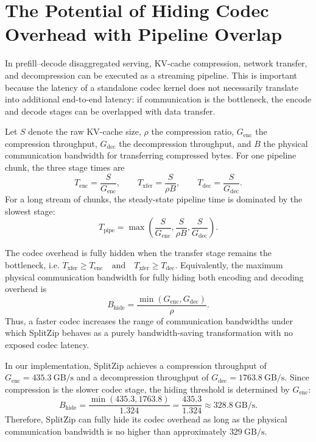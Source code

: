 \appendix

\section{The Potential of Hiding Codec Overhead with Pipeline Overlap}

In prefill--decode disaggregated serving, KV-cache compression, network transfer, and decompression can be executed as a streaming pipeline. 
This is important because the latency of a standalone codec kernel does not necessarily translate into additional end-to-end latency: if communication is the bottleneck, the encode and decode stages can be overlapped with data transfer.

Let $S$ denote the raw KV-cache size, $\rho$ the compression ratio, $G_{\mathrm{enc}}$ the compression throughput, $G_{\mathrm{dec}}$ the decompression throughput, and $B$ the physical communication bandwidth for transferring compressed bytes. 
For one pipeline chunk, the three stage times are
\[
    T_{\mathrm{enc}} = \frac{S}{G_{\mathrm{enc}}},
    \qquad
    T_{\mathrm{xfer}} = \frac{S}{\rho B},
    \qquad
    T_{\mathrm{dec}} = \frac{S}{G_{\mathrm{dec}}}.
\]
For a long stream of chunks, the steady-state pipeline time is dominated by the slowest stage:
\[
    T_{\mathrm{pipe}}
    =
    \max\left(
        \frac{S}{G_{\mathrm{enc}}},
        \frac{S}{\rho B},
        \frac{S}{G_{\mathrm{dec}}}
    \right).
\]

The codec overhead is fully hidden when the transfer stage remains the bottleneck, i.e.
    $T_{\mathrm{xfer}} \ge T_{\mathrm{enc}}
    \quad \text{and} \quad
    T_{\mathrm{xfer}} \ge T_{\mathrm{dec}}$.
Equivalently, the maximum physical communication bandwidth for fully hiding both encoding and decoding overhead is
\[
    B_{\mathrm{hide}}
    =
    \frac{\min(G_{\mathrm{enc}}, G_{\mathrm{dec}})}{\rho}.
\]
Thus, a faster codec increases the range of communication bandwidths under which SplitZip behaves as a purely bandwidth-saving transformation with no exposed codec latency.

In our implementation, SplitZip achieves a compression throughput of $G_{\mathrm{enc}} = 435.3~\mathrm{GB/s}$ and a decompression throughput of
$G_{\mathrm{dec}} = 1763.8~\mathrm{GB/s}$. Since compression is the slower codec stage, the hiding threshold is determined by $G_{\mathrm{enc}}$:
\[
    B_{\mathrm{hide}}
    =
    \frac{\min(435.3, 1763.8)}{1.324}
    =
    \frac{435.3}{1.324}
    \approx
    328.8~\mathrm{GB/s}.
\]
Therefore, SplitZip can fully hide its codec overhead as long as the physical communication bandwidth is no higher than approximately $329~\mathrm{GB/s}$.


